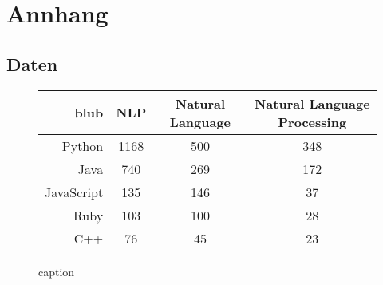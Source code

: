 \section*{Annhang}
	\subsection*{Daten}
    	\begin{figure}[H]
			\centering       
			\begin{tabular}{ r || c | c | c}
            	blub & NLP & Natural Language & Natural Language Processing \\ \hline \hline
                Python & 1168 & 500 & 348\\ \hline
                Java & 740 & 269 & 172\\ \hline
                JavaScript & 135 & 146 & 37 \\ \hline
                Ruby & 103 & 100 & 28 \\ \hline
                C++ & 76  & 45 & 23 \\ \hline
			\end{tabular}
        	\caption{caption}
			\label{tab:zzz}
		\end{figure}